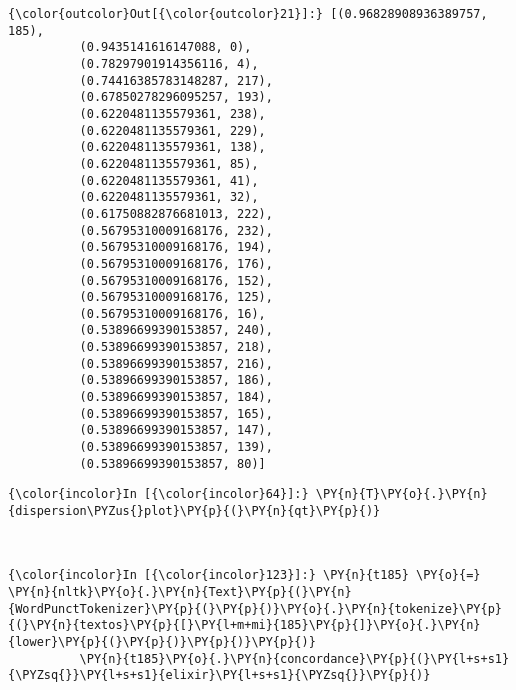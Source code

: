             \begin{Verbatim}[commandchars=\\\{\}]
{\color{outcolor}Out[{\color{outcolor}21}]:} [(0.96828908936389757, 185),
          (0.9435141616147088, 0),
          (0.78297901914356116, 4),
          (0.74416385783148287, 217),
          (0.67850278296095257, 193),
          (0.6220481135579361, 238),
          (0.6220481135579361, 229),
          (0.6220481135579361, 138),
          (0.6220481135579361, 85),
          (0.6220481135579361, 41),
          (0.6220481135579361, 32),
          (0.61750882876681013, 222),
          (0.56795310009168176, 232),
          (0.56795310009168176, 194),
          (0.56795310009168176, 176),
          (0.56795310009168176, 152),
          (0.56795310009168176, 125),
          (0.56795310009168176, 16),
          (0.53896699390153857, 240),
          (0.53896699390153857, 218),
          (0.53896699390153857, 216),
          (0.53896699390153857, 186),
          (0.53896699390153857, 184),
          (0.53896699390153857, 165),
          (0.53896699390153857, 147),
          (0.53896699390153857, 139),
          (0.53896699390153857, 80)]
\end{Verbatim}
        
    \begin{Verbatim}[commandchars=\\\{\}]
{\color{incolor}In [{\color{incolor}64}]:} \PY{n}{T}\PY{o}{.}\PY{n}{dispersion\PYZus{}plot}\PY{p}{(}\PY{n}{qt}\PY{p}{)}
\end{Verbatim}

    \begin{center}
    \end{center}
    { \hspace*{\fill} \\}
    
    \begin{Verbatim}[commandchars=\\\{\}]
{\color{incolor}In [{\color{incolor}123}]:} \PY{n}{t185} \PY{o}{=} \PY{n}{nltk}\PY{o}{.}\PY{n}{Text}\PY{p}{(}\PY{n}{WordPunctTokenizer}\PY{p}{(}\PY{p}{)}\PY{o}{.}\PY{n}{tokenize}\PY{p}{(}\PY{n}{textos}\PY{p}{[}\PY{l+m+mi}{185}\PY{p}{]}\PY{o}{.}\PY{n}{lower}\PY{p}{(}\PY{p}{)}\PY{p}{)}\PY{p}{)}
          \PY{n}{t185}\PY{o}{.}\PY{n}{concordance}\PY{p}{(}\PY{l+s+s1}{\PYZsq{}}\PY{l+s+s1}{elixir}\PY{l+s+s1}{\PYZsq{}}\PY{p}{)}
\end{Verbatim}

